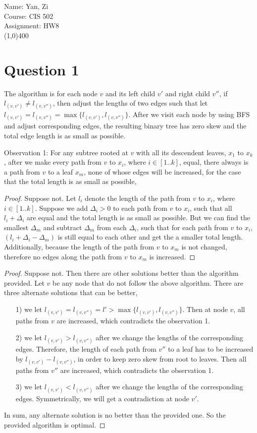 \documentclass[letter,12pt]{article}
\begin{document}
Name: Yan, Zi \\
Course: CIS 502 \\
Assignment: HW8 \\
\line(1,0){400}
\section*{Question 1}
The algorithm is for each node $v$ and its left child $v'$ and right child $v''$,
if $l_{(v,v')} \neq l_{(v, v'')}$, then adjust the lengths of two edges such that
let $l_{(v,v')} = l_{(v, v'')} = \max\{l_{(v,v')}, l_{(v, v'')}\}$. After we visit each node
by using BFS and adjust corresponding edges, the resulting binary tree has
zero skew and the total edge length is as small as possible.

Observation 1: For any subtree rooted at $v$ with all its descendent leaves, $x_1$ to 
$x_k$, after we make every path from $v$ to $x_i$, where $i \in [1..k]$, equal, there 
always is a path from $v$ to a leaf $x_m$, none of whose edges will be increased, for
the case that the total length is as small as possible,
\begin{proof}
Suppose not. Let $l_i$ denote the length of the path from $v$ to $x_i$, where $i \in 
[1..k]$. Suppose we add $\Delta_i>0$ to each path from $v$ to $x_i$, such that all 
$l_i+\Delta_i$ are equal and the total length is as small as possible. But we can find the 
smallest $\Delta_m$ and subtract $\Delta_m$ from each $\Delta_i$, such that for 
each path from $v$ to $x_i$, $(l_i+\Delta_i-\Delta_m)$ is still equal to each other and 
get the a smaller total length. Additionally, because the length of the path from 
$v$ to $x_m$ is not changed, therefore no edges along the path from $v$ to $x_m$ is 
increased. 
\end{proof}
\begin{proof}
Suppose not. Then there are other solutions better than the algorithm provided.
Let $v$ be any node that do not follow the above algorithm.
There are three alternate solutions that can be better, 
\begin{itemize}
    \item[1)] we let $l_{(v,v')} = l_{(v, v'')} = l' >  \max\{l_{(v,v')}, l_{(v, v'')}\}$. Then at
    node $v$, all paths from $v$ are increased, which contradicts the observation 1.
    \item[2)] we let $l_{(v,v')} > l_{(v, v'')}$ after we change the lengths of the 
    corresponding edges. Therefore, the length of each path from $v''$ to a leaf has to 
    be increased by $l_{(v,v')} - l_{(v, v'')}$, in order to keep zero skew from root to 
    leaves. Then all paths from $v''$ are increased, which contradicts the observation 1.
    \item[3)] we let $l_{(v,v')} < l_{(v, v'')}$ after we change the lengths of the 
    corresponding edges. Symmetrically, we will get a contradiction at node $v'$.
\end{itemize}
In sum, any alternate solution is no better than the provided one. So the provided
algorithm is optimal.
\end{proof}
\end{document}
